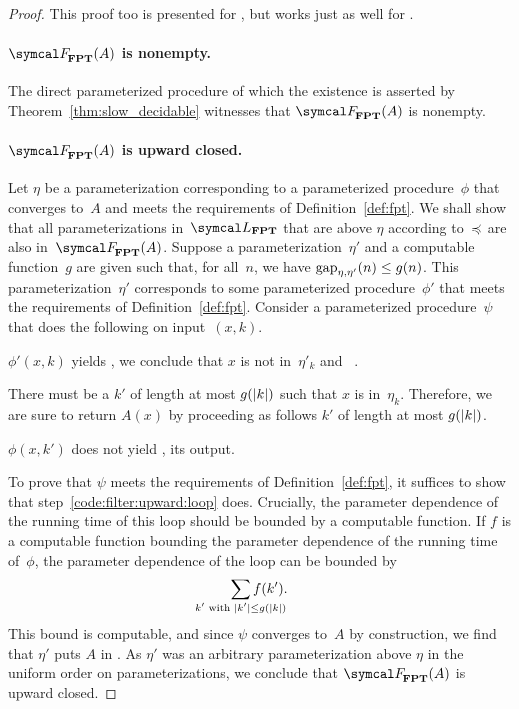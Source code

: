 \begin{proof}
  This proof too is presented for , but works just as well for .

  \paragraph{$\calF_\cl{FPT}(A)$ is nonempty.}
  The direct parameterized procedure of which the existence is asserted by Theorem~\ref{thm:slow_decidable} witnesses that $\calF_\cl{FPT}(A)$ is nonempty.

  \paragraph{$\calF_\cl{FPT}(A)$ is upward closed.}
  Let $\eta$ be a parameterization corresponding to a parameterized procedure~$\phi$ that converges to~$A$ and meets the requirements of Definition~\ref{def:fpt}.
  We shall show that all parameterizations in~$\calL_\cl{FPT}$ that are above $\eta$ according to~$\preccurlyeq$ are also in~$\calF_\cl{FPT}(A)$.
  Suppose a parameterization~$\eta'$ and a computable function~$g$ are given such that, for all~$n$, we have $\operatorname{gap}_{\eta, \eta'}(n) \le g(n)$.
  This parameterization~$\eta'$ corresponds to some parameterized procedure~$\phi'$ that meets the requirements of Definition~\ref{def:fpt}.
  Consider a parameterized procedure~$\psi$ that does the following on input~$(x, k)$.
  \begin{codelisting}
  \item
     $\phi'(x, k)$ yields , we conclude that $x$ is not in~$\eta'_k$ and ~.
  \item\label{code:filter:upward:loop}%
    There must be a $k'$ of length at most $g(\length{k})$ such that $x$ is in~$\eta_k$.
    Therefore, we are sure to return $A(x)$ by proceeding as follows  $k'$ of length at most $g(\length{k})$.
    \begin{codelisting}
    \item {} $\phi(x, k')$ does not yield ,  its output.
    \end{codelisting}
  \end{codelisting}

  To prove that $\psi$ meets the requirements of Definition~\ref{def:fpt}, it suffices to show that step~\ref{code:filter:upward:loop} does.
  Crucially, the parameter dependence of the running time of this loop should be bounded by a computable function.
  If $f$ is a computable function bounding the parameter dependence of the running time of~$\phi$, the parameter dependence of the loop can be bounded by
  \begin{equation*}
    \sum_{\mathclap{k'\text{ with }\length{k'} \le g(\length{k})}} f(k').
  \end{equation*}
  This bound is computable, and since $\psi$ converges to~$A$ by construction, we find that $\eta'$ puts $A$ in .
  As $\eta'$ was an arbitrary parameterization above $\eta$ in the uniform order on parameterizations, we conclude that $\calF_\cl{FPT}(A)$ is upward closed.


\end{proof}
